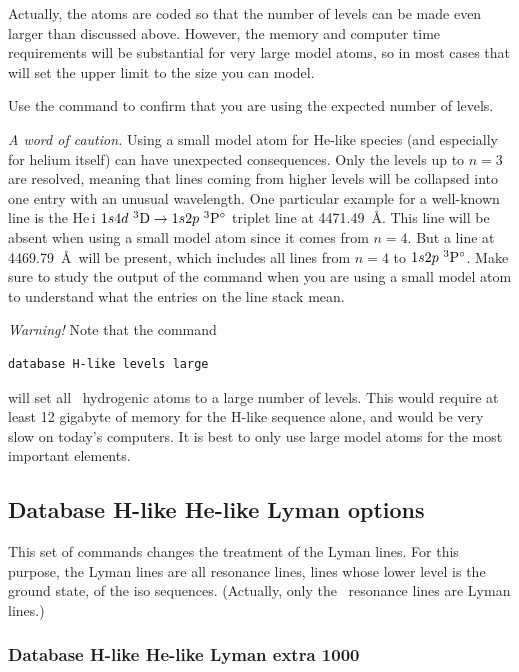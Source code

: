 Actually, the atoms are
coded so that the number of levels can be made even larger than discussed above.
However, the memory and computer time requirements
will be substantial for very large model atoms, so in most cases that will
set the upper limit to the size you can model.

Use the  command to confirm that you are using
the expected number of levels.

{\it A word of caution.} Using a small model atom for He-like species (and
especially for helium itself) can have unexpected consequences. Only the
levels up to $n = 3$ are resolved, meaning that lines coming from higher
levels will be collapsed into one entry with an unusual wavelength. One
particular example for a well-known line is the He\,{\sc i} $1s4d\ ^{3}{\rm D}
\rightarrow 1s2p\ ^{3}{\rm P}^\circ$ triplet line at 4471.49~\AA. This line
will be absent when using a small model atom since it comes from $n = 4$. But
a line at 4469.79~\AA\ will be present, which includes all lines from $n=4$ to
$1s2p\ ^{3}{\rm P}^\circ$. Make sure to study the output of the
 command when you are using a small model atom to
understand what the entries on the line stack mean.

\emph{Warning!}  Note that the command
\begin{verbatim}
database H-like levels large
\end{verbatim}
will set all \LIMELM\ hydrogenic atoms to a large number of levels.
This would
require at least 12 gigabyte of memory for the H-like sequence alone,
and would be very slow on today's computers.
It is best to only use large model atoms for the
most important elements.

\subsection{Database H-like \OR{} He-like Lyman options}

This set of commands changes the treatment of the Lyman lines.
For this purpose, the Lyman lines are all resonance lines,
lines whose lower level is the ground state,  of the  iso sequences.
(Actually, only the \hi\ resonance lines are Lyman lines.)

\subsubsection{Database H-like \OR{} He-like Lyman extra 1000}  

